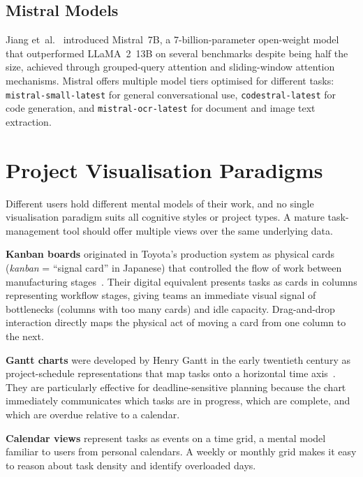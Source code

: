 \subsection*{Mistral Models}

Jiang et~al.~\cite{jiang2023mistral} introduced Mistral~7B, a 7-billion-parameter
open-weight model that outperformed LLaMA~2~13B on several benchmarks despite being
half the size, achieved through grouped-query attention and sliding-window attention
mechanisms.
Mistral offers multiple model tiers optimised for different tasks:
\texttt{mistral-small-latest} for general conversational use,
\texttt{codestral-latest} for code generation, and
\texttt{mistral-ocr-latest} for document and image text extraction.



\section{Project Visualisation Paradigms}\label{sec:bg_viz}

Different users hold different mental models of their work, and no single visualisation
paradigm suits all cognitive styles or project types.
A mature task-management tool should offer multiple views over the same underlying data.

\textbf{Kanban boards} originated in Toyota's production system as physical cards
(\emph{kanban} = ``signal card'' in Japanese) that controlled the flow of work between
manufacturing stages~\cite{anderson2010kanban}.
Their digital equivalent presents tasks as cards in columns representing workflow stages,
giving teams an immediate visual signal of bottlenecks (columns with too many cards)
and idle capacity.
Drag-and-drop interaction directly maps the physical act of moving a card from one column
to the next.

\textbf{Gantt charts} were developed by Henry Gantt in the early twentieth century as
project-schedule representations that map tasks onto a horizontal time axis~\cite{wilson2003gantt}.
They are particularly effective for deadline-sensitive planning because the chart
immediately communicates which tasks are in progress, which are complete, and which are
overdue relative to a calendar.

\textbf{Calendar views} represent tasks as events on a time grid, a mental model
familiar to users from personal calendars.
A weekly or monthly grid makes it easy to reason about task density and identify
overloaded days.

